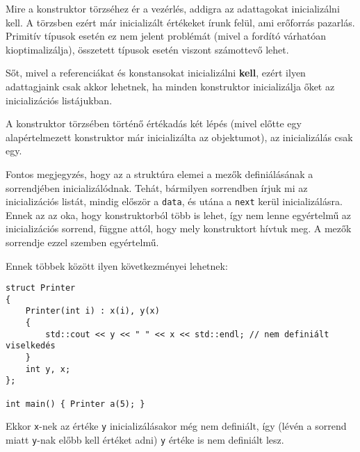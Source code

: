 \documentclass[a4paper,11.5pt,table]{article}
\begin{document}
	Mire a konstruktor törzséhez ér a vezérlés, addigra az adattagokat inicializálni kell. A törzsben ezért már inicializált értékeket írunk felül, ami erőforrás pazarlás. Primitív típusok esetén ez nem jelent problémát (mivel a fordító várhatóan kioptimalizálja), összetett típusok esetén viszont számottevő lehet.
	
	Sőt, mivel a referenciákat és konstansokat inicializálni \textbf{kell}, ezért ilyen adattagjaink csak akkor lehetnek, ha minden konstruktor inicializálja őket az inicializációs listájukban.
	\begin{note}
	    A konstruktor törzsében történő értékadás két lépés (mivel előtte egy alapértelmezett konstruktor már inicializálta az objektumot), az inicializálás csak egy.
	\end{note}
	Fontos megjegyzés, hogy az a struktúra elemei a mezők definiálásának a sorrendjében inicializálódnak. Tehát, bármilyen sorrendben írjuk mi az inicializációs listát, mindig először a \texttt{data}, és utána a \texttt{next} kerül inicializálásra. Ennek az az oka, hogy konstruktorból több is lehet, így nem lenne egyértelmű az inicializációs sorrend, függne attól, hogy mely konstruktort hívtuk meg. A mezők sorrendje ezzel szemben egyértelmű.
	
	Ennek többek között ilyen következményei lehetnek:
	\begin{lstlisting}
struct Printer
{
	Printer(int i) : x(i), y(x) 
	{
		std::cout << y << " " << x << std::endl; // nem definiált viselkedés
	}
	int y, x;
};

int main() { Printer a(5); }
	\end{lstlisting}
	Ekkor \texttt{x}-nek az értéke \texttt{y} inicializálásakor még nem definiált, így (lévén a sorrend miatt \texttt{y}-nak előbb kell értéket adni) \texttt{y} értéke is nem definiált lesz.
	
\end{document}
